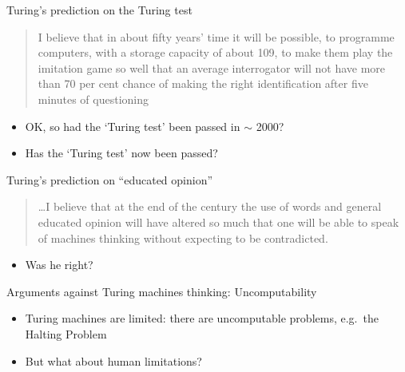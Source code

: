 \documentclass[10pt]{beamer}
\begin{document}
\begin{titledslide}{Turing's prediction on the Turing test}

  \begin{quote}
    I believe that in about fifty years' time it will be possible, to
    programme computers, with a storage capacity of about 109, to make
    them play the imitation game so well that an average interrogator
    will not have more than 70 per cent chance of making the right
    identification after five minutes of questioning
  \end{quote}

  \begin{itemize}
  \item OK, so had the `Turing test' been passed in $\sim$ 2000?
  \item Has the `Turing test' now been passed?
  \end{itemize}
  
\end{titledslide}
\begin{titledslide}{Turing's prediction on ``educated opinion''}

  \begin{quote}
    \dots I believe that at the end of the century the use of words
    and general educated opinion will have altered so much that one
    will be able to speak of machines thinking without expecting to be
    contradicted.
  \end{quote}

  \begin{itemize}
  \item Was he right?
  \end{itemize}
  
\end{titledslide}
\begin{titledslide}{Arguments against Turing machines thinking: Uncomputability}

  \begin{itemize}
  \item Turing machines are limited: there are uncomputable problems,
    e.g.\ the Halting Problem
  \item But what about human limitations?
  \end{itemize}
  
\end{titledslide}
\end{document}
